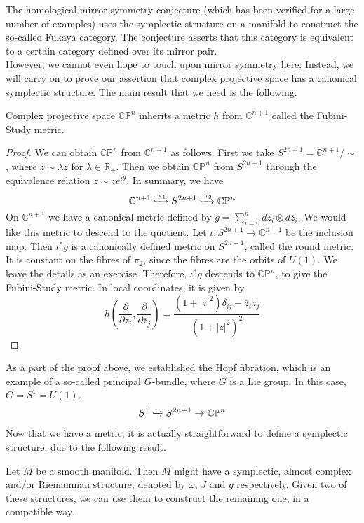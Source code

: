 The homological mirror symmetry conjecture (which has been verified for a large number of examples) uses the symplectic structure on a manifold to construct the so-called Fukaya category. The conjecture asserts that this category is equivalent to a certain category defined over its mirror pair.\\
However, we cannot even hope to touch upon mirror symmetry here. Instead, we will carry on to prove our assertion that complex projective space has a canonical symplectic structure. The main result that we need is the following.
\begin{theorem}
  Complex projective space $\mathbb{CP}^n$ inherits a metric $h$ from $\mathbb{C}^{n+1}$ called the Fubini-Study metric.
\end{theorem}
\begin{proof}
  We can obtain $\mathbb{CP}^n$ from $\mathbb{C}^{n+1}$ as follows. First we take $S^{2n+1}=\mathbb{C}^{n+1}/\sim$, where $z\sim\lambda z$ for $\lambda\in\mathbb{R}_+$. Then we obtain $\mathbb{CP}^n$ from $S^{2n+1}$ through the equivalence relation $z\sim ze^{i\theta}$. In summary, we have
  $$\mathbb{C}^{n+1}\xhookrightarrow{\pi_1} S^{2n+1}\xhookrightarrow{\pi_2}\mathbb{CP}^n$$
  On $\mathbb{C}^{n+1}$ we have a canonical metric defined by $g=\sum_{i=0}^{n}dz_i\otimes d\overline{z}_i$. We would like this metric to descend to the quotient. Let $\iota:S^{2n+1}\to\mathbb{C}^{n+1}$ be the inclusion map. Then $\iota^*g$ is a canonically defined metric on $S^{2n+1}$, called the round metric. It is constant on the fibres of $\pi_2$, since the fibres are the orbits of $U(1)$. We leave the details as an exercise. Therefore, $\iota^*g$ descends to $\mathbb{CP}^n$, to give the Fubini-Study metric. In local coordinates, it is given by
  $$h(\frac{\partial}{\partial z_i},\frac{\partial}{\partial\overline{z}_j})=\frac{(1+|z|^2)\delta_{ij}-\overline{z}_iz_j}{(1+|z|^2)^2}$$
\end{proof}
\begin{remark}
  As a part of the proof above, we established the Hopf fibration, which is an example of a so-called principal $G$-bundle, where $G$ is a Lie group. In this case, $G=S^1=U(1)$.
  $$S^1\xhookrightarrow{}S^{2n+1}\to\mathbb{CP}^n$$
\end{remark}
Now that we have a metric, it is actually straightforward to define a symplectic structure, due to the following result.
\begin{theorem}
  Let $M$ be a smooth manifold. Then $M$ might have a symplectic, almost complex and/or Riemannian structure, denoted by $\omega$, $J$ and $g$ respectively. Given two of these structures, we can use them to construct the remaining one, in a compatible way.
\end{theorem}
